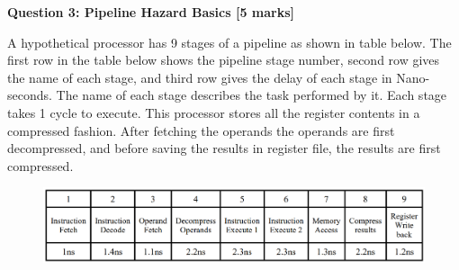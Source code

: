 \documentclass[addpoints]{exam}
\begin{document}
\begin{sloppypar}
\begin{questions}
    \question[5]\begin{center}
        \textbf{Question 3: Pipeline Hazard Basics [5 marks]}
    \end{center}

    A hypothetical processor has 9 stages of a pipeline as shown in table below. The first row in the table below shows the pipeline stage number, second row gives the name of each stage, and third row gives the delay of each stage in Nano-seconds. The name of each stage describes the task performed by it. Each stage takes 1 cycle to execute. This processor stores all the register contents in a compressed fashion. After fetching the operands the operands are first decompressed, and before saving the results in register file, the results are first compressed.

    \begin{figure}[ht]
        \centering
        \includegraphics[scale = 0.45]{q3_fig.png}
    \end{figure}

\end{questions}
\end{sloppypar}
\end{document}
